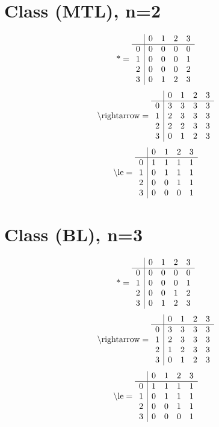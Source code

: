 \documentclass[11pt]{article}
\begin{document}
\section{Class (MTL), n=2}
\[\text{*} = 
\begin{array}{r | r r r r}
 & 0 & 1 & 2 & 3 \\ \hline
0 & 0 & 0 & 0 & 0 \\
1 & 0 & 0 & 0 & 1 \\
2 & 0 & 0 & 0 & 2 \\
3 & 0 & 1 & 2 & 3 \\
\end{array}
\]
\[\text{\textbackslash rightarrow} = 
\begin{array}{r | r r r r}
 & 0 & 1 & 2 & 3 \\ \hline
0 & 3 & 3 & 3 & 3 \\
1 & 2 & 3 & 3 & 3 \\
2 & 2 & 2 & 3 & 3 \\
3 & 0 & 1 & 2 & 3 \\
\end{array}
\]
\[\text{\textbackslash le} = 
\begin{array}{r | r r r r}
 & 0 & 1 & 2 & 3 \\ \hline
0 & 1 & 1 & 1 & 1 \\
1 & 0 & 1 & 1 & 1 \\
2 & 0 & 0 & 1 & 1 \\
3 & 0 & 0 & 0 & 1 \\
\end{array}
\]

\section{Class (BL), n=3}
\[\text{*} = 
\begin{array}{r | r r r r}
 & 0 & 1 & 2 & 3 \\ \hline
0 & 0 & 0 & 0 & 0 \\
1 & 0 & 0 & 0 & 1 \\
2 & 0 & 0 & 1 & 2 \\
3 & 0 & 1 & 2 & 3 \\
\end{array}
\]
\[\text{\textbackslash rightarrow} = 
\begin{array}{r | r r r r}
 & 0 & 1 & 2 & 3 \\ \hline
0 & 3 & 3 & 3 & 3 \\
1 & 2 & 3 & 3 & 3 \\
2 & 1 & 2 & 3 & 3 \\
3 & 0 & 1 & 2 & 3 \\
\end{array}
\]
\[\text{\textbackslash le} = 
\begin{array}{r | r r r r}
 & 0 & 1 & 2 & 3 \\ \hline
0 & 1 & 1 & 1 & 1 \\
1 & 0 & 1 & 1 & 1 \\
2 & 0 & 0 & 1 & 1 \\
3 & 0 & 0 & 0 & 1 \\
\end{array}
\]
\end{document}

